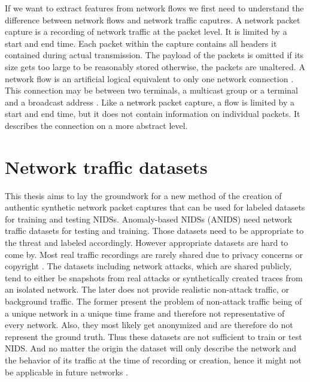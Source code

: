 \documentclass[
	ngerman,
	ruledheaders=section,%
	class=report,%
	thesis={type=bachelor},%
	accentcolor=9c,%
	custommargins=true,%
	marginpar=false,%
	parskip=half-,%
	fontsize=11pt,%
]{tudapub}
\begin{document}
If we want to extract features from network flows
we first need to understand the difference between network flows and network traffic caputres.
A network packet capture is a recording of network traffic at the packet level.
It is limited by a start and end time.
Each packet within the capture contains all headers it contained during actual transmission.
The payload of the packets is omitted if its size gets too large to be reasonably stored otherwise, the packets are unaltered.
A network flow is an artificial logical equivalent to only one network connection \cite{brownleeTrafficFlowMeasurement}.
This connection may be between two terminals, a multicast group or a terminal and a broadcast address \cite{rajahalmeIPv6FlowLabel}.
Like a network packet capture, a flow is limited by a start and end time,
but it does not contain information on individual packets.
It describes the connection on a more abstract level.

\section{Network traffic datasets}

This thesis aims to lay the groundwork for a new method of the creation of authentic synthetic network packet captures
that can be used for labeled datasets for training and testing NIDSs.
Anomaly-based NIDSs (ANIDS) need network traffic datasets for testing and training.
Those datasets need to be appropriate to the threat and labeled accordingly.
However appropriate datasets are hard to come by.
Most real traffic recordings are rarely shared due to privacy concerns \cite{ringFlowbasedNetworkTraffic2019a} or copyright \cite{corderoID2TDIYDataset2015}.
The datasets including network attacks,
which are shared publicly,
tend to either be snapshots from real attacks or synthetically created traces from an isolated network.
The later does not provide realistic non-attack traffic, or background traffic.
The former present the problem of non-attack traffic being of a unique network in a unique time frame and therefore not representative of every network.
Also, they most likely get anonymized and are therefore do not represent the ground truth.
Thus these datasets are not sufficient to train or test NIDS.
And no matter the origin the dataset will only describe the network and the behavior of its traffic at the time of recording or creation, hence it might not be applicable in future networks \cite{ringFlowbasedNetworkTraffic2019a}.

\end{document}
